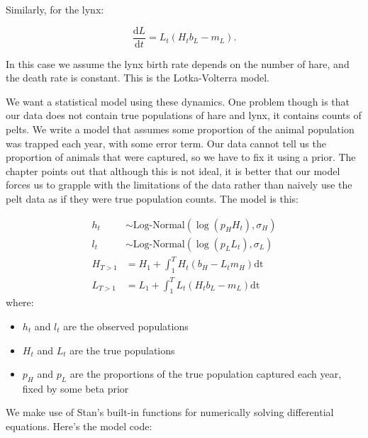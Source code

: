\documentclass[
]{book}
\providecommand{\tightlist}{%
  \setlength{\itemsep}{0pt}\setlength{\parskip}{0pt}}
\begin{document}
Similarly, for the lynx:

\[
\frac{\text{d}L}{\text{d}t} = L_t (H_t b_L - m_L).
\]

In this case we assume the lynx birth rate depends on the number of hare, and the death rate is constant. This is the Lotka-Volterra model.

We want a statistical model using these dynamics. One problem though is that our data does not contain true populations of hare and lynx, it contains counts of pelts. We write a model that assumes some proportion of the animal population was trapped each year, with some error term. Our data cannot tell us the proportion of animals that were captured, so we have to fix it using a prior. The chapter points out that although this is not ideal, it is better that our model forces us to grapple with the limitations of the data rather than naively use the pelt data as if they were true population counts. The model is this:

\[
\begin{aligned}
h_{t} &\sim \text{Log-Normal}(\log(p_HH_t),\sigma_{H}) \\
l_{t} &\sim \text{Log-Normal}(\log(p_LL_t),\sigma_{L}) \\
H_{T>1} &= H_1 + \int^T_1 H_t(b_H - L_t m_H)\text{dt} \\
L_{T>1} &= L_1 + \int^T_1 L_t(H_t b_L - m_L)\text{dt}
\end{aligned}
\]
where:

\begin{itemize}
\tightlist
\item
  \(h_t\) and \(l_t\) are the observed populations
\item
  \(H_t\) and \(L_t\) are the true populations
\item
  \(p_H\) and \(p_L\) are the proportions of the true population captured each year, fixed by some beta prior
\end{itemize}

We make use of Stan's built-in functions for numerically solving differential equations. Here's the model code:
\end{document}
